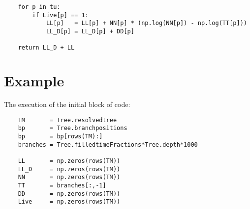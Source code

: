 \documentclass[11pt]{article}
\begin{document}
\begin{tiny}
\begin{verbatim}
    for p in tu:
        if Live[p] == 1:
            LL[p]   = LL[p] + NN[p] * (np.log(NN[p]) - np.log(TT[p]))
            LL_D[p] = LL_D[p] + DD[p]

    return LL_D + LL

\end{verbatim}


\section{Example}

The execution of the initial block of code:
\begin{verbatim}
    TM       = Tree.resolvedtree
    bp       = Tree.branchpositions
    bp       = bp[rows(TM):]
    branches = Tree.filledtimeFractions*Tree.depth*1000

    LL       = np.zeros(rows(TM))
    LL_D     = np.zeros(rows(TM))
    NN       = np.zeros(rows(TM))
    TT       = branches[:,-1]
    DD       = np.zeros(rows(TM))
    Live     = np.zeros(rows(TM))


\end{verbatim}
\end{tiny}
\end{document}
